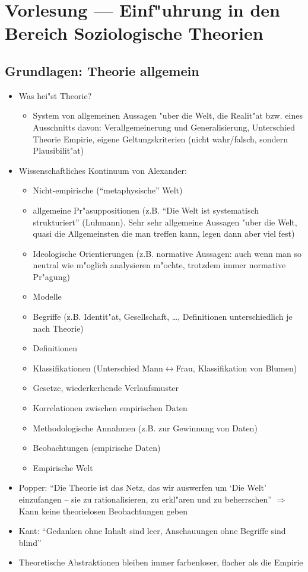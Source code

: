 \section{Vorlesung  --- Einf"uhrung in den Bereich Soziologische Theorien}
\subsection{Grundlagen: Theorie allgemein}
\begin{itemize}
	\item
		Was hei"st Theorie?
		\begin{itemize}
			\item
				System von allgemeinen Aussagen "uber die Welt, die Realit"at bzw. eines Ausschnitts davon: Verallgemeinerung und Generalisierung, Unterschied Theorie Empirie, eigene Geltungskriterien (nicht wahr/falsch, sondern Plausibilit"at)
		\end{itemize}
	\item
		Wissenschaftliches Kontinuum von Alexander:
		\begin{itemize}
			\item
				Nicht-empirische (\enquote{metaphysische} Welt)
			\item
				allgemeine Pr"asuppositionen (z.B. \enquote{Die Welt ist systematisch strukturiert} (Luhmann). Sehr sehr allgemeine Aussagen "uber die Welt, quasi die Allgemeinsten die man treffen kann, legen dann aber viel fest)
			\item
				Ideologische Orientierungen (z.B. normative Aussagen: auch wenn man so neutral wie m"oglich analysieren m"ochte, trotzdem immer normative Pr"agung)
			\item
				Modelle
			\item
				Begriffe (z.B. Identit"at, Gesellschaft, \dots, Definitionen unterschiedlich je nach Theorie)
			\item
				Definitionen
			\item
				Klassifikationen (Unterschied Mann$\leftrightarrow$Frau, Klassifikation von Blumen)
			\item
				Gesetze, wiederkerhende Verlaufsmuster
			\item
				Korrelationen zwischen empirischen Daten
			\item
				Methodologische Annahmen (z.B. zur Gewinnung von Daten)
			\item
				Beobachtungen (empirische Daten)
			\item
				Empirische Welt
		\end{itemize}
	\item
		Popper: \enquote{Die Theorie ist das Netz, das wir auswerfen um \enquote{Die Welt} einzufangen -- sie zu rationalisieren, zu erkl"aren und zu beherrschen} $\Rightarrow$ Kann keine theorielosen Beobachtungen geben
	\item
		Kant: \enquote{Gedanken ohne Inhalt sind leer, Anschauungen ohne Begriffe sind blind}
	\item
		Theoretische Abstraktionen bleiben immer farbenloser, flacher als die Empirie
\end{itemize}

